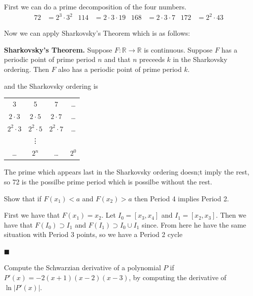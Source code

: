 \documentclass[12pt]{article}
\renewcommand{\qed}{\hfill$\blacksquare$}
\renewenvironment{proof}{\vspace{1em}\begin{addmargin}[2em]{0em}\begin{newproof}}{\end{newproof}\end{addmargin}\qed}
\newenvironment{problem}[2][Problem]{\begin{trivlist}
\item[\hskip \labelsep {\bfseries #1} \hskip \labelsep {\bfseries #2.}]}{\end{trivlist}}
\begin{document}
First we can do a prime decomposition of the four numbers.
\begin{align*}
	72 &= 2^3\cdot3^2 & 114 &= 2\cdot3\cdot19 & 168 &= 2\cdot3\cdot7 & 172 &= 2^2\cdot43
\end{align*}
	
Now we can apply Sharkovsky's Theorem which is as follows:
\begin{tcolorbox}[colback=red!5!white,colframe=red!75!black]
	\textbf{Sharkovsky's Theorem.} Suppose $F: \mathbb{R} \to \mathbb{R}$ is continuous. Suppose $F$ has a periodic point of prime period $n$ and that $n$ preceeds $k$ in the Sharkovsky ordering. Then $F$ also has a periodic point of prime period $k$.
\end{tcolorbox}
and the Sharkovsky ordering is
\begin{center}
	
\begin{tabular}{cccc}
	3 & 5 & 7 & \ldots \\
	$2\cdot3$ & $2\cdot5$ & $2\cdot 7$ & \ldots\\
	$2^2\cdot3$ & $2^2 \cdot 5$ & $2^2\cdot7$ & \ldots\\
		    & \vdots && \\
	\ldots & $2^n$ & \ldots & $2^0$
\end{tabular}

\end{center}

The prime which appears last in the Sharkovsky ordering doesn;t imply the rest, so 72 is the possilbe prime period which is possilbe without the rest.

\begin{tcolorbox}[colback=blue!5!white,colframe=blue!75!black]
	\begin{problem}{3b}
		Show that if $F(x_1) < a$ and $F(x_2) > a$ then Period 4 implies Period 2.
	\end{problem}	
\end{tcolorbox}
\begin{proof}
	First we have that $F(x_1) = x_2$. Let $I_0 = [x_3,x_4]$ and $I_1 = [x_2,x_3]$. Then we have that $F(I_0) \supset I_1$ and $F(I_1) \supset I_0 \cup I_1 $ since. From here he have the same situation with Period 3 points, so we have a Period 2 cycle
\end{proof}
\begin{tcolorbox}[colback=blue!5!white,colframe=blue!75!black]
	\begin{problem}{4a}
		Compute the Schwarzian derivative of a polynomial $P$ if $P'(x) = -2(x+1)(x-2)(x-3)$, by computing the derivative of $\ln|P'(x)|$.
	\end{problem}
\end{tcolorbox}
\end{document}
